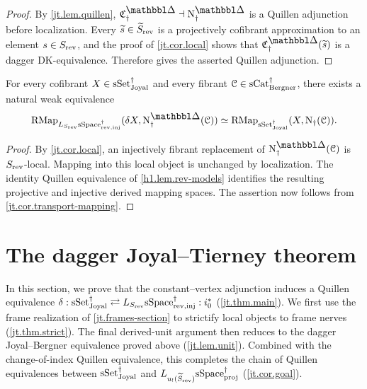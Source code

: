 \documentclass[a4paper,dvipdfmx,11pt]{amsart}
\begin{document}
\begin{proof}
  By \cref{jt.lem.quillen}, $\frakC^{\prism}_{\dag}\dashv\N^{\prism}_{\dag}$ is a Quillen adjunction before localization.
  Every $\widetilde s\in\widetilde S_{\mathrm{rev}}$ is a projectively cofibrant approximation to an element $s\in S_{\mathrm{rev}}$, and the proof of \cref{jt.cor.local} shows that $\frakC^{\prism}_{\dag}(\widetilde s)$ is a dagger DK-equivalence.
  Therefore \cite[Proposition~3.3.18 (1)]{Hir02} gives the asserted Quillen adjunction.
\end{proof}

\begin{corollary}\label{jt.cor.transport-local}
  For every cofibrant $X\in\mathrm{sSet}^{\dag}_{\mathrm{Joyal}}$ and every fibrant $\mathcal{C}\in\mathrm{sCat}^{\dag}_{\mathrm{Bergner}}$, there exists a natural weak equivalence
  \begin{align}
    \RMap_{L_{S_{\rev}}\sSpace^{\dag}_{\rev,\inj}}
    (\delta X,\N^{\prism}_{\dag}(\calC))
    \simeq
    \RMap_{\sSet^{\dag}_{\Joyal}}(X,\N_{\dag}(\calC)).
  \end{align}
\end{corollary}

\begin{proof}
  By \cref{jt.cor.local}, an injectively fibrant replacement of $\N^{\prism}_{\dag}(\calC)$ is $S_{\mathrm{rev}}$-local.
  Mapping into this local object is unchanged by localization.
  The identity Quillen equivalence of \cref{h1.lem.rev-models} identifies the resulting projective and injective derived mapping spaces.
  The assertion now follows from \cref{jt.cor.transport-mapping}.
\end{proof}

\section{The dagger Joyal--Tierney theorem}\label{jt.section}

In this section, we prove that the constant--vertex adjunction induces a Quillen equivalence $\delta: \mathrm{sSet}^{\dag}_{\mathrm{Joyal}} \rightleftarrows L_{S_{\mathrm{rev}}}\mathrm{sSpace}^{\dag}_{\mathrm{rev},\mathrm{inj}} :i_{0}^{*}$ (\cref{jt.thm.main}).
We first use the frame realization of \cref{jt.frames-section} to strictify local objects to frame nerves (\cref{jt.thm.strict}).
The final derived-unit argument then reduces to the dagger Joyal--Bergner equivalence proved above (\cref{jt.lem.unit}).
Combined with the change-of-index Quillen equivalence, this completes the chain of Quillen equivalences between $\mathrm{sSet}^{\dag}_{\mathrm{Joyal}}$ and $L_{u_{!}(\widetilde S_{\mathrm{rev}})}\mathrm{sSpace}^{\dag}_{\mathrm{proj}}$ (\cref{jt.cor.goal}).
\end{document}
